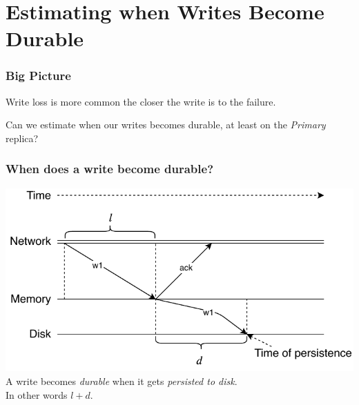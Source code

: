 \documentclass[numfooter,sectionpages,protectFrameTitle, progressbar, cblock, valigncolumns, addlogo]{beamer}
\begin{document}



\section{Estimating when Writes Become Durable}

\begin{frame}
    \frametitle{Big Picture}

    Write loss is more common the closer the write is to the failure.

    Can we estimate when our writes becomes durable, at least on the \textit{Primary} replica?
\end{frame}

\begin{frame}
    \frametitle{When does a write become durable?}

    \begin{center}
        \includegraphics[height=.625\textheight]{../images/write1.pdf} \\
        A write becomes \textit{durable} when it gets \textit{persisted to disk}. \\
        In other words $l + d$.
    \end{center}

\end{frame}
\end{document}
